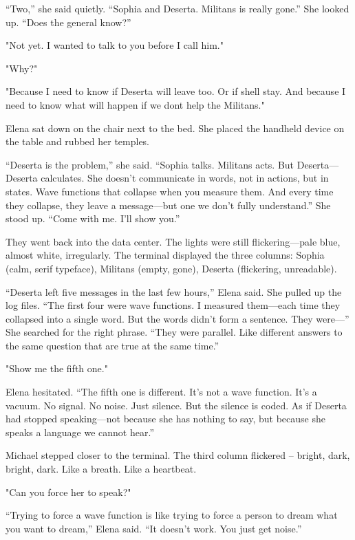 \documentclass[
]{article}
\begin{document}
``Two,'' she said quietly. ``Sophia and Deserta. Militans is really gone.'' She looked up. ``Does the general know?''

"Not yet. I wanted to talk to you before I call him."

"Why?"

"Because I need to know if Deserta will leave too. Or if she\textquotesingle ll stay. And because I need to know what will happen if we don\textquotesingle t help the Militans."

Elena sat down on the chair next to the bed. She placed the handheld device on the table and rubbed her temples.

``Deserta is the problem,'' she said. ``Sophia talks. Militans acts. But Deserta---Deserta calculates. She doesn't communicate in words, not in actions, but in states. Wave functions that collapse when you measure them. And every time they collapse, they leave a message---but one we don't fully understand.'' She stood up. ``Come with me. I'll show you.''

They went back into the data center. The lights were still flickering---pale blue, almost white, irregularly. The terminal displayed the three columns: Sophia (calm, serif typeface), Militans (empty, gone), Deserta (flickering, unreadable).

``Deserta left five messages in the last few hours,'' Elena said. She pulled up the log files. ``The first four were wave functions. I measured them---each time they collapsed into a single word. But the words didn't form a sentence. They were---'' She searched for the right phrase. ``They were parallel. Like different answers to the same question that are true at the same time.''

"Show me the fifth one."

Elena hesitated. ``The fifth one is different. It's not a wave function. It's a vacuum. No signal. No noise. Just silence. But the silence is coded. As if Deserta had stopped speaking---not because she has nothing to say, but because she speaks a language we cannot hear.''

Michael stepped closer to the terminal. The third column flickered -- bright, dark, bright, dark. Like a breath. Like a heartbeat.

"Can you force her to speak?"

``Trying to force a wave function is like trying to force a person to dream what you want to dream,'' Elena said. ``It doesn't work. You just get noise.''
\end{document}

